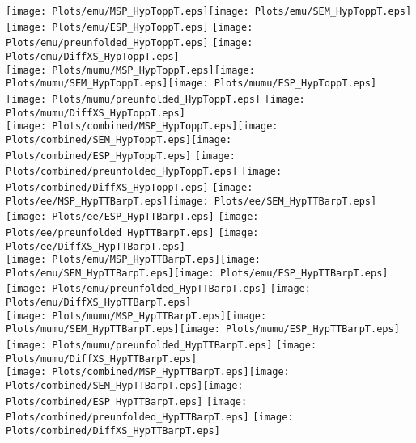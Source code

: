 \documentclass[a4paper,10pt]{article}
\begin{document}
\texttt{[image: Plots/emu/MSP\_HypToppT.eps]}\texttt{[image: Plots/emu/SEM\_HypToppT.eps]}\texttt{[image: Plots/emu/ESP\_HypToppT.eps]} \texttt{[image: Plots/emu/preunfolded\_HypToppT.eps]} \texttt{[image: Plots/emu/DiffXS\_HypToppT.eps]}\\
\texttt{[image: Plots/mumu/MSP\_HypToppT.eps]}\texttt{[image: Plots/mumu/SEM\_HypToppT.eps]}\texttt{[image: Plots/mumu/ESP\_HypToppT.eps]} \texttt{[image: Plots/mumu/preunfolded\_HypToppT.eps]} \texttt{[image: Plots/mumu/DiffXS\_HypToppT.eps]}\\
\texttt{[image: Plots/combined/MSP\_HypToppT.eps]}\texttt{[image: Plots/combined/SEM\_HypToppT.eps]}\texttt{[image: Plots/combined/ESP\_HypToppT.eps]} \texttt{[image: Plots/combined/preunfolded\_HypToppT.eps]} \texttt{[image: Plots/combined/DiffXS\_HypToppT.eps]}
\newpage
\texttt{[image: Plots/ee/MSP\_HypTTBarpT.eps]}\texttt{[image: Plots/ee/SEM\_HypTTBarpT.eps]}\texttt{[image: Plots/ee/ESP\_HypTTBarpT.eps]} \texttt{[image: Plots/ee/preunfolded\_HypTTBarpT.eps]} \texttt{[image: Plots/ee/DiffXS\_HypTTBarpT.eps]}\\
\texttt{[image: Plots/emu/MSP\_HypTTBarpT.eps]}\texttt{[image: Plots/emu/SEM\_HypTTBarpT.eps]}\texttt{[image: Plots/emu/ESP\_HypTTBarpT.eps]} \texttt{[image: Plots/emu/preunfolded\_HypTTBarpT.eps]} \texttt{[image: Plots/emu/DiffXS\_HypTTBarpT.eps]}\\
\texttt{[image: Plots/mumu/MSP\_HypTTBarpT.eps]}\texttt{[image: Plots/mumu/SEM\_HypTTBarpT.eps]}\texttt{[image: Plots/mumu/ESP\_HypTTBarpT.eps]} \texttt{[image: Plots/mumu/preunfolded\_HypTTBarpT.eps]} \texttt{[image: Plots/mumu/DiffXS\_HypTTBarpT.eps]}\\
\texttt{[image: Plots/combined/MSP\_HypTTBarpT.eps]}\texttt{[image: Plots/combined/SEM\_HypTTBarpT.eps]}\texttt{[image: Plots/combined/ESP\_HypTTBarpT.eps]} \texttt{[image: Plots/combined/preunfolded\_HypTTBarpT.eps]} \texttt{[image: Plots/combined/DiffXS\_HypTTBarpT.eps]}
\end{document}

